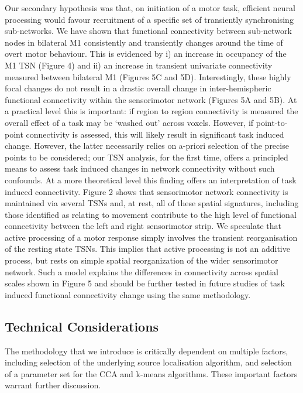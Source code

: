 Our secondary hypothesis was that, on initiation of a motor task, efficient neural processing would favour recruitment of a specific set of transiently synchronising sub-networks. We have shown that functional connectivity between sub-network nodes in bilateral M1 consistently and transiently changes around the time of overt motor behaviour. This is evidenced by i) an increase in occupancy of the M1 TSN (Figure 4) and ii) an increase in transient univariate connectivity measured between bilateral M1 (Figures 5C and 5D). Interestingly, these highly focal changes do not result in a drastic overall change in inter-hemispheric functional connectivity within the sensorimotor network (Figures 5A and 5B). At a practical level this is important: if region to region connectivity is measured the overall effect of a task may be ‘washed out’ across voxels. However, if point-to-point connectivity is assessed, this will likely result in significant task induced change. However, the latter necessarily relies on a-priori selection of the precise points to be considered; our TSN analysis, for the first time, offers a principled means to assess task induced changes in network connectivity without such confounds. At a more theoretical level this finding offers an interpretation of task induced connectivity. Figure 2 shows that sensorimotor network connectivity is maintained via several TSNs and, at rest, all of these spatial signatures, including those identified as relating to movement contribute to the high level of functional connectivity between the left and right sensorimotor strip. We speculate that active processing of a motor response simply involves the transient reorganisation of the resting state TSNs. This implies that active processing is not an additive process, but rests on simple spatial reorganization of the wider sensorimotor network. Such a model explains the differences in connectivity across spatial scales shown in Figure 5 and should be further tested in future studies of task induced functional connectivity change using the same methodology.

\subsection{Technical Considerations}
The methodology that we introduce is critically dependent on multiple factors, including selection of the underlying source localisation algorithm, and selection of a parameter set for the CCA and k-means algorithms. These important factors warrant further discussion. 

